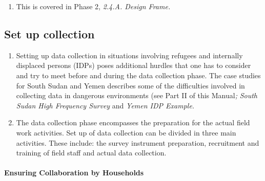 \documentclass[
]{article}
\providecommand{\tightlist}{%
  \setlength{\itemsep}{0pt}\setlength{\parskip}{0pt}}
\begin{document}
\begin{enumerate}
\def\labelenumi{\arabic{enumi}.}
\setcounter{enumi}{319}
\tightlist
\item
  This is covered in Phase 2, \emph{2.4.A. Design Frame.}
\end{enumerate}

\hypertarget{set-up-collection}{%
\subsection{Set up collection}\label{set-up-collection}}

\begin{enumerate}
\def\labelenumi{\arabic{enumi}.}
\setcounter{enumi}{320}
\item
  Setting up data collection in situations involving refugees and
  internally displaced persons (IDPs) poses additional hurdles that
  one has to consider and try to meet before and during the data
  collection phase. The case studies for South Sudan and Yemen
  describes some of the difficulties involved in collecting data in
  dangerous environments (see Part II of this Manual\emph{;} \emph{South Sudan
  High Frequency Survey} and \emph{Yemen IDP Example.}
\item
  The data collection phase encompasses the preparation for the
  actual field work activities. Set up of data collection can be
  divided in three main activities. These include: the survey
  instrument preparation, recruitment and training of field staff and
  actual data collection.
\end{enumerate}

\hypertarget{ensuring-collaboration-by-households}{%
\paragraph{Ensuring Collaboration by Households}\label{ensuring-collaboration-by-households}}
\end{document}
